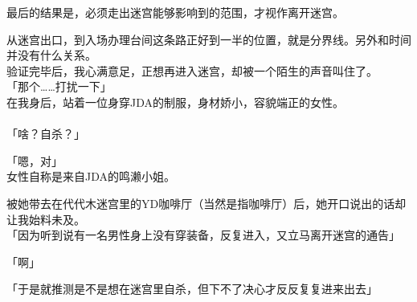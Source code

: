 最后的结果是，必须走出迷宫能够影响到的范围，才视作离开迷宫。

从迷宫出口，到入场办理台间这条路正好到一半的位置，就是分界线。另外和时间并没有什么关系。\\

验证完毕后，我心满意足，正想再进入迷宫，却被一个陌生的声音叫住了。\\

「那个……打扰一下」\\

在我身后，站着一位身穿JDA的制服，身材娇小，容貌端正的女性。\\

\sqsplit\\

「啥？自杀？」

「嗯，对」\\

女性自称是来自JDA的鸣濑小姐。

被她带去在代代木迷宫里的YD咖啡厅（当然是指咖啡厅）后，她开口说出的话却让我始料未及。\\

「因为听到说有一名男性身上没有穿装备，反复进入，又立马离开迷宫的通告」

「啊」

「于是就推测是不是想在迷宫里自杀，但下不了决心才反反复复进来出去」\\

